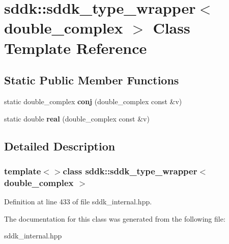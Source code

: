 \hypertarget{classsddk_1_1sddk__type__wrapper_3_01double__complex_01_4}{}\section{sddk\+:\+:sddk\+\_\+type\+\_\+wrapper$<$ double\+\_\+complex $>$ Class Template Reference}
\label{classsddk_1_1sddk__type__wrapper_3_01double__complex_01_4}
\subsection*{Static Public Member Functions}
\begin{DoxyCompactItemize}
\item 
\hypertarget{classsddk_1_1sddk__type__wrapper_3_01double__complex_01_4_aa3096bfd146ff9c570ba1b0ea09c6afa}{}static double\+\_\+complex {\bfseries conj} (double\+\_\+complex const \&v)\label{classsddk_1_1sddk__type__wrapper_3_01double__complex_01_4_aa3096bfd146ff9c570ba1b0ea09c6afa}

\item 
\hypertarget{classsddk_1_1sddk__type__wrapper_3_01double__complex_01_4_a471254f5695d46170c5877ec51b88819}{}static double {\bfseries real} (double\+\_\+complex const \&v)\label{classsddk_1_1sddk__type__wrapper_3_01double__complex_01_4_a471254f5695d46170c5877ec51b88819}

\end{DoxyCompactItemize}


\subsection{Detailed Description}
\subsubsection*{template$<$$>$class sddk\+::sddk\+\_\+type\+\_\+wrapper$<$ double\+\_\+complex $>$}



Definition at line 433 of file sddk\+\_\+internal.\+hpp.



The documentation for this class was generated from the following file\+:\begin{DoxyCompactItemize}
\item 
sddk\+\_\+internal.\+hpp\end{DoxyCompactItemize}
